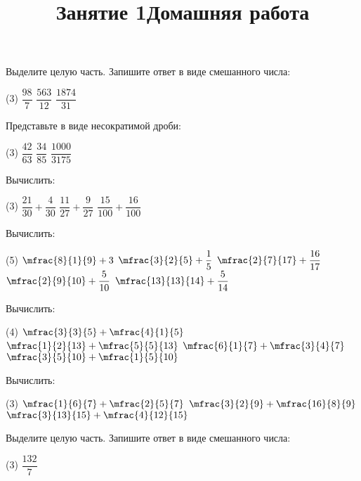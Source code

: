 %
%
%
%
\begin{class}[number=1]
	\title{Занятие 1}
	\begin{listofex}
		\item Выделите целую часть. Запишите ответ в виде смешанного числа:
		\begin{tasks}(3)
			\task \( \dfrac{98}{7} \)
			\task \( \dfrac{563}{12} \)
			\task \( \dfrac{1874}{31} \)
		\end{tasks}
		\item Представьте в виде несократимой дроби:
		\begin{tasks}(3)
			\task \( \dfrac{42}{63} \)
			\task \( \dfrac{34}{85} \)
			\task \( \dfrac{1000}{3175} \)
		\end{tasks}
		\item Вычислить:
		\begin{tasks}(3)
			\task \( \dfrac{21}{30}+\dfrac{4}{30} \)
			\task \( \dfrac{11}{27}+\dfrac{9}{27} \)
			\task \( \dfrac{15}{100}+\dfrac{16}{100} \)
		\end{tasks}
		\item Вычислить:
		\begin{tasks}(5)
			\task \( \mfrac{8}{1}{9}+3 \)
			\task \( \mfrac{3}{2}{5}+\dfrac{1}{5} \)
			\task \( \mfrac{2}{7}{17}+\dfrac{16}{17} \)
			\task \( \mfrac{2}{9}{10}+\dfrac{5}{10} \)
			\task \( \mfrac{13}{13}{14}+\dfrac{5}{14} \)
		\end{tasks}
		\item Вычислить:
		\begin{tasks}(4)
			\task \( \mfrac{3}{3}{5}+\mfrac{4}{1}{5} \)
			\task \( \mfrac{1}{2}{13}+\mfrac{5}{5}{13} \)
			\task \( \mfrac{6}{1}{7}+\mfrac{3}{4}{7} \)
			\task \( \mfrac{3}{5}{10}+\mfrac{1}{5}{10} \)
		\end{tasks}
		\item Вычислить:
		\begin{tasks}(3)
			\task \( \mfrac{1}{6}{7}+\mfrac{2}{5}{7} \)
			\task \( \mfrac{3}{2}{9}+\mfrac{16}{8}{9} \)
			\task \( \mfrac{3}{13}{15}+\mfrac{4}{12}{15} \)
		\end{tasks}
	\end{listofex}
	\newpage
	\title{Домашняя работа}
	\begin{listofex}
		\item Выделите целую часть. Запишите ответ в виде смешанного числа:
		\begin{tasks}(3)
			\task \( \dfrac{132}{7} \)

\end{tasks}
\end{listofex}
\end{class}
